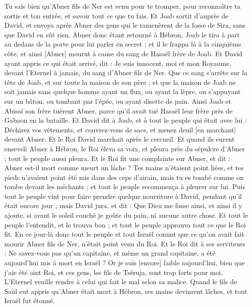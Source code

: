 \begin{multicols}{2}
Tu sais bien qu'Abner fils de Ner est venu pour te tromper, pour reconnaître ta sortie et ton entrée, et savoir tout ce que tu fais.
Et Joab sortit d'auprès de David, et envoya après Abner des gens qui le ramenèrent de la fosse de Sira, sans que David en sût rien.
Abner donc étant retourné à Hébron, Joab le tira à part au dedans de la porte pour lui parler en secret ; et il le frappa là à la cinquième côte, et ainsi [Abner] mourut à cause du sang de Hasaël frère de Joab.
Et David ayant appris ce qui était arrivé, dit : Je suis innocent, moi et mon Royaume, devant l'Eternel à jamais, du sang d'Abner fils de Ner.
Que ce sang s'arrête sur la tête de Joab, et sur toute la maison de son père ; et que la maison de Joab ne soit jamais sans quelque homme ayant un flux, ou ayant la lèpre, ou s'appuyant sur un bâton, ou tombant par l'épée, ou ayant disette de pain.
Ainsi Joab et Abisaï son frère tuèrent Abner, parce qu'il avait tué Hasaël leur frère près de Gabaon en la bataille.
Et David dit à Joab, et à tout le peuple qui était avec lui : Déchirez vos vêtements, et couvrez-vous de sacs, et menez deuil [en marchant] devant Abner. Et le Roi David marchait après le cercueil.
Et quand ils eurent enseveli Abner à Hébron, le Roi éleva sa voix, et pleura près du sépulcre d'Abner ; tout le peuple aussi pleura.
Et le Roi fit une complainte sur Abner, et dit : Abner est-il mort comme meurt un lâche ?
Tes mains n'étaient point liées, et tes pieds n'avaient point été mis dans des ceps d'airain, mais tu es tombé comme on tombe devant les méchants ; et tout le peuple recommença à pleurer sur lui.
Puis tout le peuple vint pour faire prendre quelque nourriture à David, pendant qu'il était encore jour ; mais David jura, et dit : Que Dieu me fasse ainsi, et ainsi il y ajoute, si avant le soleil couché je goûte du pain, ni aucune autre chose.
Et tout le peuple l'entendit, et le trouva bon ; et tout le peuple approuva tout ce que le Roi fit.
En ce jour-là donc tout le peuple et tout Israël connut que ce qu'on avait fait mourir Abner fils de Ner, n'était point venu du Roi.
Et le Roi dit à ses serviteurs : Ne savez-vous pas qu'un capitaine, et même un grand capitaine, a été aujourd'hui mis à mort en Israël ?
Or je suis [encore] faible aujourd'hui, bien que j'aie été oint Roi, et ces gens, les fils de Tséruja, sont trop forts pour moi. L'Eternel veuille rendre à celui qui fait le mal selon sa malice.
\VerseOne{}Quand le fils de Saül eut appris qu'Abner était mort à Hébron, ses mains devinrent lâches, et tout Israël fut étonné.

\end{multicols}
